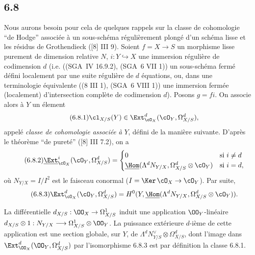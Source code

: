 \subsection*{6.8}
Nous aurons besoin pour cela de quelques rappels sur la classe de cohomologie ``de Hodge'' associée à un sous-schéma régulièrement plongé d'un schéma lisse et les résidus de Grothendieck ([8] III 9). Soient $f=X\to S$ un morphisme lisse purement de dimension relative $N$, $i:Y\hookrightarrow X$ une immersion régulière de codimension $d$ (i.e. ((SGA~IV 16.9.2), (SGA~6 VII 1)) un sous-schéma fermé défini localement par une suite régulière de $d$ équations, ou, dans une terminologie équivalente ((8 III 1), (SGA~6 VIII 1)) une immersion fermée (localement) d'intersection complète de codimension $d$). Posons $g=fi$. On associe alors à $Y$ un élement
\begin{equation}
\tag{6.8.1}
\cl_{X/S}(Y)\in\Ext^d_{\cO_X}(\cO_Y,\Omega^d_{X/S}),
\end{equation}
appelé \emph{classe de cohomologie associée à} $Y$, défini de la manière suivante. D'après le théorème ``de pureté'' ([8] III 7.2), on a
\begin{equation}
\tag{6.8.2}
\underline{\Ext}^i_{\cO_X}(\cO_Y,\Omega^d_{X/S})=
\begin{cases}
0& \text{si } i\ne d\\
\underline{\Hom}(\Lambda^d N_{Y/X},\Omega^d_{X/S}\otimes\cO_Y)& \text{si } i=d,
\end{cases}
\end{equation}
où $N_{Y/X}=I/I^2$ est le faisceau conormal ($I=\Ker\,\cO_X\to\cO_Y$). Par suite,
\begin{equation}
\tag{6.8.3}
\Ext^d_{\cO_X}(\cO_Y,\Omega^d_{X/S})=H^0(Y,\underline{\Hom}(\Lambda^dN_{Y/X},\Omega^d_{X/S}\otimes\cO_Y)).
\end{equation}

La différentielle $d_{X/S}:\OO_X\to\Omega^1_{X/S}$ induit une application $\OO_Y$-linéaire $d_{X/S}\otimes 1:N_{Y/X}\longrightarrow \Omega^1_{X/S}\otimes\OO_Y$. La puissance extérieure $d$-ième de cette application est une section globale, sur $Y$, de $\Lambda^d N_{Y/S}^{\vee}\otimes\Omega^d_{X/S}$, dont l'image dans $\Ext^d_{\OO_X}(\OO_Y,\Omega^d_{X/S})$ par l'isomorphisme 6.8.3 est par définition la classe 6.8.1.

